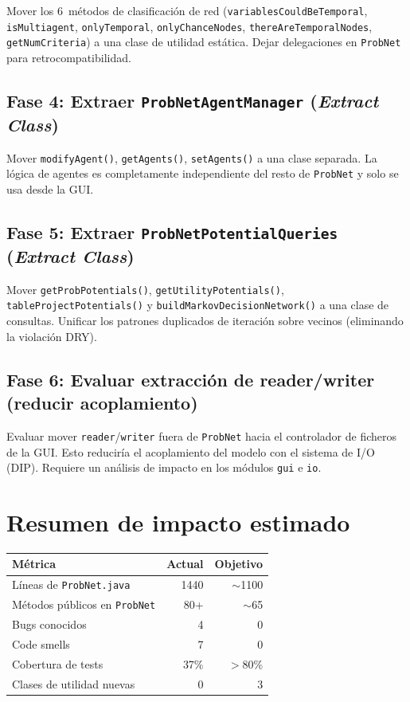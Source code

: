 \documentclass[11pt,a4paper]{article}
\newcommand{\code}[1]{\texttt{#1}}
\begin{document}
Mover los 6~m\'etodos de clasificaci\'on de red
(\code{variablesCouldBeTemporal}, \code{isMultiagent},
\code{onlyTemporal}, \code{onlyChanceNodes},
\code{thereAreTemporalNodes}, \code{getNumCriteria}) a una clase de
utilidad est\'atica.  Dejar delegaciones en \code{ProbNet} para
retrocompatibilidad.

\subsection{Fase 4: Extraer \code{ProbNetAgentManager} (\emph{Extract Class})}

Mover \code{modifyAgent()}, \code{getAgents()}, \code{setAgents()} a
una clase separada.  La l\'ogica de agentes es completamente
independiente del resto de \code{ProbNet} y solo se usa desde la GUI.

\subsection{Fase 5: Extraer \code{ProbNetPotentialQueries} (\emph{Extract Class})}

Mover \code{getProbPotentials()}, \code{getUtilityPotentials()},
\code{tableProjectPotentials()} y \code{buildMarkovDecisionNetwork()} a
una clase de consultas.  Unificar los patrones duplicados de iteraci\'on
sobre vecinos (eliminando la violaci\'on DRY).

\subsection{Fase 6: Evaluar extracci\'on de reader/writer (reducir acoplamiento)}

Evaluar mover \code{reader}/\code{writer} fuera de \code{ProbNet} hacia
el controlador de ficheros de la GUI.  Esto reducir\'ia el acoplamiento
del modelo con el sistema de I/O (DIP).  Requiere un an\'alisis de
impacto en los m\'odulos \code{gui} e \code{io}.

\section{Resumen de impacto estimado}

\begin{center}
\begin{tabular}{lrr}
\toprule
\textbf{M\'etrica} & \textbf{Actual} & \textbf{Objetivo} \\
\midrule
L\'ineas de \code{ProbNet.java}        & 1440  & $\sim$1100 \\
M\'etodos p\'ublicos en \code{ProbNet} & 80+   & $\sim$65 \\
Bugs conocidos                          & 4     & 0 \\
Code smells                             & 7     & 0 \\
Cobertura de tests                      & 37\%  & $>$80\% \\
Clases de utilidad nuevas               & 0     & 3 \\
\bottomrule
\end{tabular}
\end{center}
\end{document}

